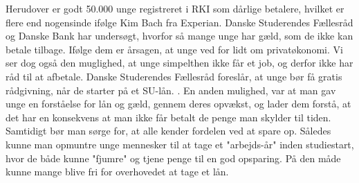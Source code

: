Herudover er godt 50.000 unge registreret i RKI som dårlige betalere, hvilket er flere end nogensinde ifølge Kim Bach fra Experian. Danske Studerendes Fællesråd og Danske Bank har undersøgt, hvorfor så mange unge har gæld, som de ikke kan betale tilbage. Ifølge dem er årsagen, at unge ved for lidt om privatøkonomi. Vi ser dog også den muglighed, at unge simpelthen ikke får et job, og derfor ikke har råd til at afbetale. Danske Studerendes Fællesråd foreslår, at unge bør få gratis rådgivning, når de starter på et SU-lån. \cite{dr.dk}. En anden mulighed, var at man gav unge en forståelse for lån og gæld, gennem deres opvækst, og lader dem forstå, at det har en konsekvens at man ikke får betalt de penge man skylder til tiden. Samtidigt bør man sørge for, at alle kender fordelen ved at spare op. Således kunne man opmuntre unge mennesker til at tage et "arbejds-år" inden studiestart, hvor de både kunne "fjumre" og tjene penge til en god opsparing. På den måde kunne mange blive fri for overhovedet at tage et lån.
